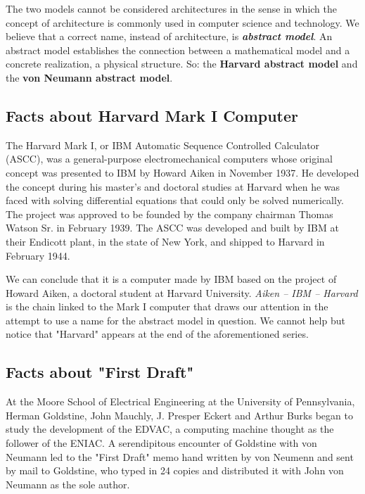 \bigskip

The two models cannot be considered architectures in the sense in which the concept of architecture is commonly used in computer science and technology. We believe that a correct name, instead of architecture, is {\bf {\em abstract model}}. An abstract model establishes the connection between a mathematical model and a concrete realization, a physical structure. So: the {\bf Harvard abstract model} and the {\bf von Neumann abstract model}.

\subsection{Facts about Harvard Mark I Computer}

The Harvard Mark I, or IBM Automatic Sequence Controlled Calculator (ASCC), was a general-purpose electromechanical computers whose original concept was presented to IBM by Howard Aiken in November 1937. He developed the concept during his master's and doctoral studies at Harvard when he was faced with solving differential equations that could only be solved numerically. The project was approved to be founded by the company chairman Thomas Watson Sr. in February 1939. The ASCC was developed and built by IBM at their Endicott plant, in the state of New York, and shipped to Harvard in February 1944.

We can conclude that it is a computer made by IBM based on the project of Howard Aiken, a doctoral student at Harvard University. {\em Aiken -- IBM -- Harvard} is the chain linked to the Mark I computer that draws our attention in the attempt to use a name for the abstract model in question. We cannot help but notice that "Harvard" appears at the end of the aforementioned series.


\subsection{Facts about "First Draft"}\label{sec:first_draft_facts}

At the Moore School of Electrical Engineering at the University of Pennsylvania, Herman Goldstine, John Mauchly, J. Presper Eckert and Arthur Burks began to study the development of the EDVAC, a computing machine thought as the follower of the ENIAC. A serendipitous encounter of Goldstine with von Neumann led to the "First Draft" memo hand written by von Neumenn and sent by mail to Goldstine, who typed in 24 copies and distributed it with John von Neumann as the sole author.  

